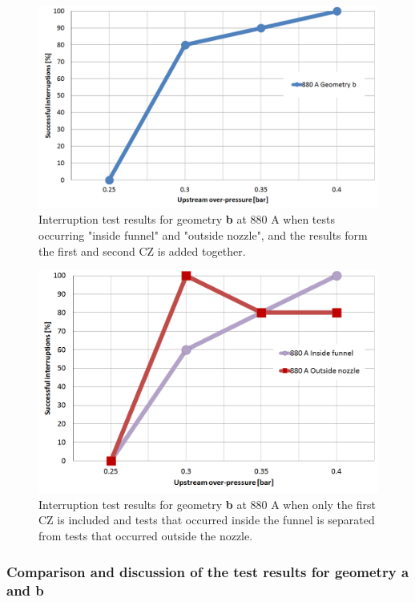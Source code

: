 \documentclass[10pt,b5paper,twoside]{article}
\begin{document}
\begin{figure}[H]
\centering
\includegraphics[scale=0.45]{Bilder/Results/geoB880amp.PNG}
\caption{Interruption test results for geometry \textbf{b} at 880 A when tests occurring "inside funnel" and "outside nozzle", and the results form the first and second CZ is added together.} \label{fig:results880AgeoB}
\end{figure}

\begin{figure}[H]
\centering
\includegraphics[scale=0.45]{Bilder/Results/geoB880ampcomp.PNG}
\caption{Interruption test results for geometry \textbf{b} at 880 A when only the first CZ is included and tests that occurred inside the funnel is separated from tests that occurred outside the nozzle.} \label{fig:results880AgeoBcomp}
\end{figure}

\subsubsection{Comparison and discussion of the test results for geometry \textbf{a} and \textbf{b}} \label{sec:compAandB}
\end{document}
